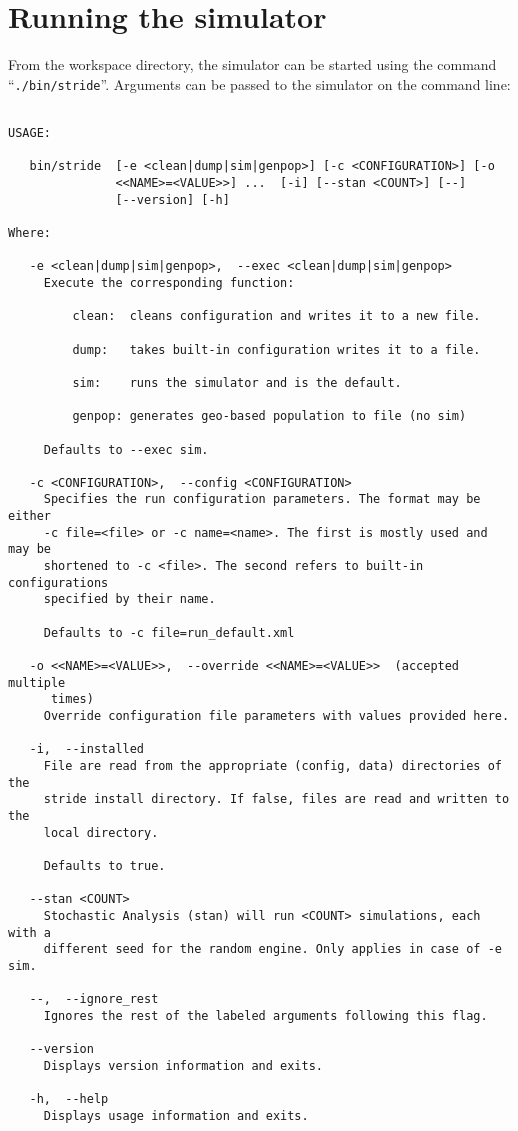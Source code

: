 \section{Running the simulator}

From the workspace directory, the simulator can be started  using the command \mbox{``\texttt{./bin/stride}''}. Arguments can be passed to the simulator on the command line:
\begin{verbatim}

USAGE: 
 
   bin/stride  [-e <clean|dump|sim|genpop>] [-c <CONFIGURATION>] [-o
               <<NAME>=<VALUE>>] ...  [-i] [--stan <COUNT>] [--]
               [--version] [-h]
               
Where: 
 
   -e <clean|dump|sim|genpop>,  --exec <clean|dump|sim|genpop>
     Execute the corresponding function:  
 
         clean:  cleans configuration and writes it to a new file.  
 
         dump:   takes built-in configuration writes it to a file.  
 
         sim:    runs the simulator and is the default.  
 
         genpop: generates geo-based population to file (no sim)
 
     Defaults to --exec sim.
 
   -c <CONFIGURATION>,  --config <CONFIGURATION>
     Specifies the run configuration parameters. The format may be either
     -c file=<file> or -c name=<name>. The first is mostly used and may be
     shortened to -c <file>. The second refers to built-in configurations
     specified by their name.
 
     Defaults to -c file=run_default.xml
 
   -o <<NAME>=<VALUE>>,  --override <<NAME>=<VALUE>>  (accepted multiple
      times)
     Override configuration file parameters with values provided here.
 
   -i,  --installed
     File are read from the appropriate (config, data) directories of the
     stride install directory. If false, files are read and written to the
     local directory. 
 
     Defaults to true.
 
   --stan <COUNT>
     Stochastic Analysis (stan) will run <COUNT> simulations, each with a
     different seed for the random engine. Only applies in case of -e sim.
 
   --,  --ignore_rest
     Ignores the rest of the labeled arguments following this flag.
 
   --version
     Displays version information and exits.
 
   -h,  --help
     Displays usage information and exits.

\end{verbatim}

